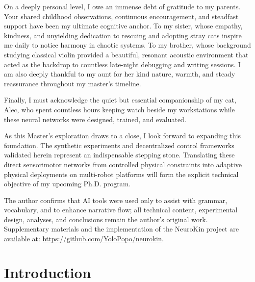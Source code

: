 \documentclass[12pt,a4paper,oneside]{report}
\begin{document}
On a deeply personal level, I owe an immense debt of gratitude to my parents. Your shared childhood observations, continuous encouragement, and steadfast support have been my ultimate cognitive anchor. To my sister, whose empathy, kindness, and unyielding dedication to rescuing and adopting stray cats inspire me daily to notice harmony in chaotic systems. To my brother, whose background studying classical violin provided a beautiful, resonant acoustic environment that acted as the backdrop to countless late-night debugging and writing sessions. I am also deeply thankful to my aunt for her kind nature, warmth, and steady reassurance throughout my master's timeline.

Finally, I must acknowledge the quiet but essential companionship of my cat, Alec, who spent countless hours keeping watch beside my workstations while these neural networks were designed, trained, and evaluated. 

As this Master's exploration draws to a close, I look forward to expanding this foundation. The synthetic experiments and decentralized control frameworks validated herein represent an indispensable stepping stone. Translating these direct sensorimotor networks from controlled physical constraints into adaptive physical deployments on multi-robot platforms will form the explicit technical objective of my upcoming Ph.D. program.

The author confirms that AI tools were used only to assist with grammar, vocabulary, and to enhance narrative flow; all technical content, experimental design, analyses, and conclusions remain the author's original work. Supplementary materials and the implementation of the NeuroKin project are available at: \url{https://github.com/YoloPopo/neurokin}.
\clearpage

\tableofcontents
\clearpage
\listoffigures
{}
\clearpage
\listoftables
{}
\clearpage


\chapter{Introduction}
\label{chap:intro}
\end{document}

